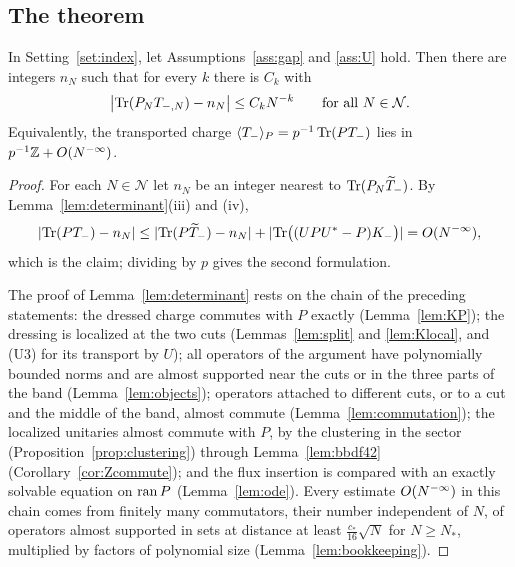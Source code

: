 \subsection{The theorem}

\begin{theorem}\label{thm:index}
In Setting~\ref{set:index}, let Assumptions~\ref{ass:gap} and \ref{ass:U} hold. Then there are integers $n_N$ such
that for every $k$ there is $C_k$ with
\[
\bigl\lvert\operatorname{Tr}(P_NT_{-,N})-n_N\bigr\rvert\le C_kN^{-k}\qquad\text{for all }N\in\mathcal N .
\]
Equivalently, the transported charge $\langle T_-\rangle_{P}=p^{-1}\operatorname{Tr}(PT_-)$ lies in $p^{-1}\mathbb{Z}+O(N^{-\infty})$.
\end{theorem}

\begin{proof}
For each $N\in\mathcal N$ let $n_N$ be an integer nearest to $\operatorname{Tr}(P_N\widetilde{T}_{-})$. By Lemma~\ref{lem:determinant}(iii) and (iv),
\[
\lvert\operatorname{Tr}(PT_-)-n_N\rvert\le\lvert\operatorname{Tr}(P\widetilde{T}_{-})-n_N\rvert+\lvert\operatorname{Tr}\bigl((UPU^*-P)K_-\bigr)\rvert=O(N^{-\infty}) ,
\]
which is the claim; dividing by $p$ gives the second formulation.

The proof of Lemma~\ref{lem:determinant} rests on the chain of the preceding statements: the dressed charge commutes
with $P$ exactly (Lemma~\ref{lem:KP}); the dressing is localized at the two cuts (Lemmas~\ref{lem:split} and
\ref{lem:Klocal}, and (U3) for its transport by $U$); all operators of the argument have polynomially bounded norms and
are almost supported near the cuts or in the three parts of the band (Lemma~\ref{lem:objects}); operators attached to
different cuts, or to a cut and the middle of the band, almost commute (Lemma~\ref{lem:commutation}); the localized
unitaries almost commute with $P$, by the clustering in the sector (Proposition~\ref{prop:clustering}) through
Lemma~\ref{lem:bbdf42} (Corollary~\ref{cor:Zcommute}); and the flux insertion is compared with an exactly solvable
equation on $\operatorname{ran} P$ (Lemma~\ref{lem:ode}). Every estimate $O(N^{-\infty})$ in this chain comes from finitely many commutators,
their number independent of $N$, of operators almost supported in sets at distance at least $\frac{c_*}{16}\sqrt N$
for $N\ge N_*$, multiplied by factors of polynomial size (Lemma~\ref{lem:bookkeeping}).


\end{proof}
